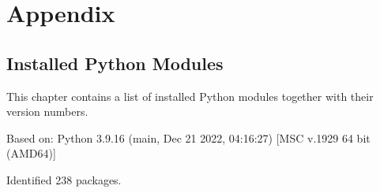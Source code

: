 %
\chapter{Appendix}
\section{Installed Python Modules}
This chapter contains a list of installed Python modules together with their version numbers.

\vspace{2ex}

Based on: Python 3.9.16 (main, Dec 21 2022, 04:16:27) [MSC v.1929 64 bit (AMD64)]

\vspace{2ex}

Identified 238 packages.
\vspace{2ex}
